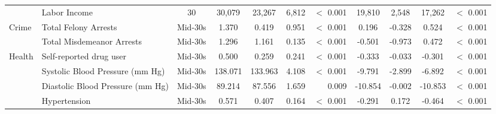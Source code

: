 \begin{tabular}{l l c c c c r c c c r}
 & Labor Income & 30 & 30,079 & 23,267 & 6,812 & $ < $ 0.001 & 19,810 & 2,548 & 17,262 & $ < $ 0.001 \\
Crime & Total Felony Arrests & Mid-30s & 1.370 & 0.419 & 0.951 & $ < $ 0.001 & 0.196 & -0.328 & 0.524 & $ < $ 0.001 \\
 & Total Misdemeanor Arrests & Mid-30s & 1.296 & 1.161 & 0.135 & $ < $ 0.001 & -0.501 & -0.973 & 0.472 & $ < $ 0.001 \\
Health & Self-reported drug user & Mid-30s & 0.500 & 0.259 & 0.241 & $ < $ 0.001 & -0.333 & -0.033 & -0.301 & $ < $ 0.001 \\
 & Systolic Blood Pressure (mm Hg) & Mid-30s & 138.071 & 133.963 & 4.108 & $ < $ 0.001 & -9.791 & -2.899 & -6.892 & $ < $ 0.001 \\
 & Diastolic Blood Pressure (mm Hg) & Mid-30s & 89.214 & 87.556 & 1.659 & 0.009 & -10.854 & -0.002 & -10.853 & $ < $ 0.001 \\
 & Hypertension & Mid-30s & 0.571 & 0.407 & 0.164 & $ < $ 0.001 & -0.291 & 0.172 & -0.464 & $ < $ 0.001 \\
\bottomrule
\end{tabular}
